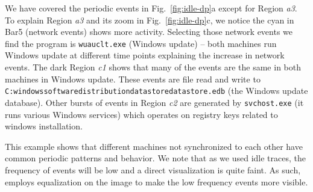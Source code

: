 We have covered the periodic events in Fig.~\ref{fig:idle-dp}a except
for Region {\em a3}.
To explain Region {\em a3} and its zoom in Fig.~\ref{fig:idle-dp}c, 
we notice the cyan in Bar5 (network events) shows more activity.
Selecting those network events we find the
program is {\tt wuauclt.exe} (Windows update) --
both machines run Windows update at different time points explaining
the increase in network events.
The dark Region {\em c1} shows that many of the events are the same 
in both machines in Windows update.
These events are file read and write to
{\tt C:\BS windows\BS softwaredistribution\BS datastore\BS datastore.edb}
(the Windows update database).
Other bursts of events in Region {\em c2} are generated by
{\tt svchost.exe} (it runs various Windows services) 
which operates on registry keys related to
windows installation.

This example shows that different machines not synchronized to 
each other have common periodic patterns and behavior.
We note that as we used idle traces, the frequency
of events will be low and a direct visualization is quite
faint. As such, \VDP{} employs equalization on the image 
to make the low frequency events more visible.


